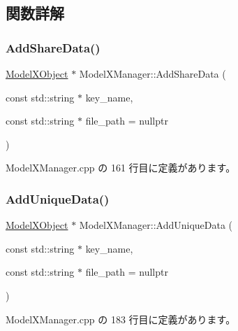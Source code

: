 \subsection{関数詳解}
\mbox{\label{class_model_x_manager_a395565622dff14d4ff80bf64611f9a36}} 
\subsubsection{\texorpdfstring{Add\+Share\+Data()}{AddShareData()}}
{\footnotesize\ttfamily \mbox{\hyperlink{class_model_x_object}{Model\+X\+Object}} $\ast$ Model\+X\+Manager\+::\+Add\+Share\+Data (\begin{DoxyParamCaption}\item[{const std\+::string $\ast$}]{key\+\_\+name,  }\item[{const std\+::string $\ast$}]{file\+\_\+path = {\ttfamily nullptr} }\end{DoxyParamCaption})\hspace{0.3cm}{\ttfamily [static]}}



 Model\+X\+Manager.\+cpp の 161 行目に定義があります。

\mbox{\label{class_model_x_manager_a0a0cd728e7b92de6c18e96026708d97b}} 
\subsubsection{\texorpdfstring{Add\+Unique\+Data()}{AddUniqueData()}}
{\footnotesize\ttfamily \mbox{\hyperlink{class_model_x_object}{Model\+X\+Object}} $\ast$ Model\+X\+Manager\+::\+Add\+Unique\+Data (\begin{DoxyParamCaption}\item[{const std\+::string $\ast$}]{key\+\_\+name,  }\item[{const std\+::string $\ast$}]{file\+\_\+path = {\ttfamily nullptr} }\end{DoxyParamCaption})\hspace{0.3cm}{\ttfamily [static]}}



 Model\+X\+Manager.\+cpp の 183 行目に定義があります。

